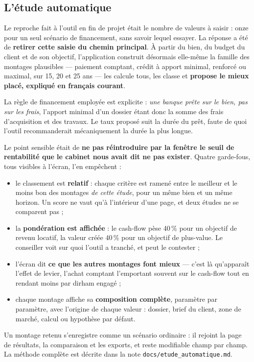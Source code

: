 \documentclass[11pt,a4paper]{article}
\begin{document}
\subsection{L'étude automatique}
Le reproche fait à l'outil en fin de projet était le nombre de valeurs à saisir : onze pour un seul scénario de financement, sans savoir lequel essayer. La réponse a été de \textbf{retirer cette saisie du chemin principal}. À partir du bien, du budget du client et de son objectif, l'application construit désormais elle-même la famille des montages plausibles — paiement comptant, crédit à apport minimal, renforcé ou maximal, sur 15, 20 et 25 ans — les calcule tous, les classe et \textbf{propose le mieux placé, expliqué en français courant}.

La règle de financement employée est explicite : \textit{une banque prête sur le bien, pas sur les frais}, l'apport minimal d'un dossier étant donc la somme des frais d'acquisition et des travaux. Le taux proposé suit la durée du prêt, faute de quoi l'outil recommanderait mécaniquement la durée la plus longue.

Le point sensible était de \textbf{ne pas réintroduire par la fenêtre le seuil de rentabilité que le cabinet nous avait dit ne pas exister}. Quatre garde-fous, tous visibles à l'écran, l'en empêchent :

\begin{itemize}
	\item le classement est \textbf{relatif} : chaque critère est ramené entre le meilleur et le moins bon des montages \emph{de cette étude}, pour un même bien et un même horizon. Un score ne vaut qu'à l'intérieur d'une page, et deux études ne se comparent pas ;
	\item la \textbf{pondération est affichée} : le cash-flow pèse 40\,\% pour un objectif de revenu locatif, la valeur créée 40\,\% pour un objectif de plus-value. Le conseiller voit sur quoi l'outil a tranché, et peut le contester ;
	\item l'écran dit \textbf{ce que les autres montages font mieux} — c'est là qu'apparaît l'effet de levier, l'achat comptant l'emportant souvent sur le cash-flow tout en rendant moins par dirham engagé ;
	\item chaque montage affiche sa \textbf{composition complète}, paramètre par paramètre, avec l'origine de chaque valeur : dossier, brief du client, zone de marché, calcul ou hypothèse par défaut.
\end{itemize}

Un montage retenu s'enregistre comme un scénario ordinaire : il rejoint la page de résultats, la comparaison et les exports, et reste modifiable champ par champ. La méthode complète est décrite dans la note \texttt{docs/etude\_automatique.md}.
\end{document}
